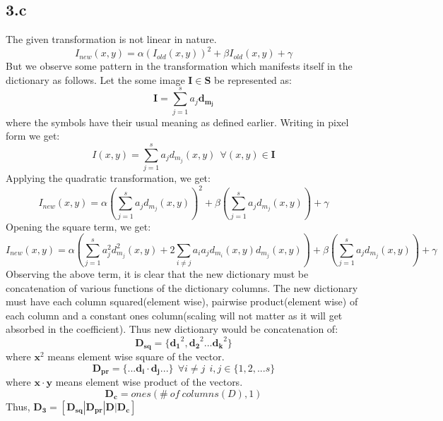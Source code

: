 \documentclass[12pt]{article}
\begin{document}
\subsection*{3.c}
The given transformation is not linear in nature.
\begin{equation*}
	I_{new}(x,y) = \alpha(I_{old}(x,y))^2+\beta I_{old}(x,y)+\gamma
\end{equation*}
But we observe some pattern in the transformation which manifests itself in the dictionary as follows. Let the some image $\boldsymbol{I}\in \boldsymbol{S}$ be represented as:
\begin{equation*}
	\boldsymbol{I} = \sum_{j=1}^{s} a_j\boldsymbol{d_{m_j}}  
\end{equation*}
where the symbols have their usual meaning as defined earlier. Writing in pixel form we get:
\begin{equation*}
	I(x,y) = \sum_{j=1}^{s} a_jd_{m_j}(x,y) \ \ \forall (x,y) \in \boldsymbol{I}
\end{equation*}
Applying the quadratic transformation, we get:
\begin{equation*}
	I_{new}(x,y) = \alpha(\sum_{j=1}^{s} a_jd_{m_j}(x,y))^2+\beta(\sum_{j=1}^{s} a_jd_{m_j}(x,y))+\gamma 
\end{equation*}
Opening the square term, we get:
\begin{equation*}
	I_{new}(x,y) = \alpha(\sum_{j=1}^{s} a_j^2d_{m_j}^2(x,y)+2\sum_{i\not= j}a_ia_jd_{m_i}(x,y)d_{m_j}(x,y))+\beta(\sum_{j=1}^{s} a_jd_{m_j}(x,y))+\gamma 
\end{equation*}
Observing the above term, it is clear that the new dictionary must be concatenation of various functions of the dictionary columns. The new dictionary must have each column squared(element wise), pairwise product(element wise) of each column and a constant ones column(scaling will not matter as it will get absorbed in the coefficient). Thus new dictionary would be concatenation of:
\begin{equation*}
	\boldsymbol{D_{sq}} = \{\boldsymbol{d_1}^2, \boldsymbol{d_2}^2... \boldsymbol{d_k}^2\}
\end{equation*}
where $\boldsymbol{x}^2$ means element wise square of the vector. 
\begin{equation*}
	\boldsymbol{D_{pr}} = \{...\boldsymbol{d_i}\cdot\boldsymbol{d_j}...\} \ \ \forall i\not=j \ \ i,j\in \{1, 2, ... s\}
\end{equation*}
where $\boldsymbol{x\cdot y}$ means element wise product of the vectors.
\begin{equation*}
	\boldsymbol{D_c} = ones(\# \ of \ columns(D), 1)
\end{equation*}
Thus, $\boldsymbol{D_3} = [\boldsymbol{D_{sq}}| \boldsymbol{D_{pr}}| \boldsymbol{D}| \boldsymbol{D_c}]$
\end{document}
